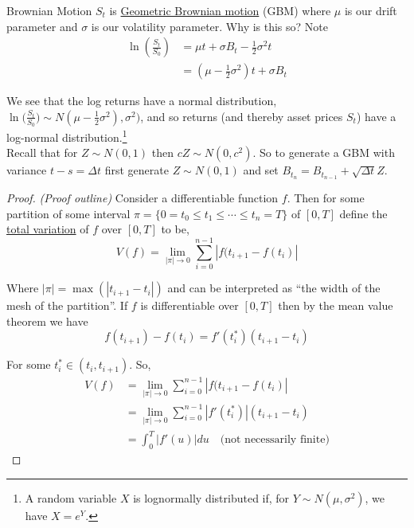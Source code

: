 \documentclass[12pt]{article}
\newenvironment{theorem}[2][Theorem:]{\begin{trivlist} %
\item[\hskip \labelsep {\bfseries #1}\hskip \labelsep {\bfseries #2.}]}{\end{trivlist}}
\newlength\tindent
\renewcommand{\indent}{\hspace*{\tindent}}
\begin{document}
\begin{section}{Brownian Motion}
\indent $S_t$ is \underline{Geometric Brownian motion} (GBM) where $\mu$ is our drift parameter and $\sigma$ is our volatility parameter. Why is this so? Note
\begin{align*}
	\ln \left( \frac{S_t}{S_0} \right) &= \mu t + \sigma B_t - \frac{1}{2}\sigma^2 t \\
	&= \left( \mu - \frac{1}{2}\sigma^2 \right)t + \sigma B_t 
\end{align*}

\indent  We see that the log returns have a normal distribution, $\ln\big(\frac{S_t}{S_0}\big) \sim N(\mu - \frac{1}{2}\sigma^2), \sigma^2)$, and so returns (and thereby asset prices $S_t$) have a log-normal distribution.\footnote{A random variable $X$ is lognormally distributed if, for $Y\sim N(\mu, \sigma^2)$, we have $X=e^Y$.} \\

\indent Recall that for $Z\sim N(0,1)$ then $cZ\sim N(0, c^2)$. So to generate a GBM with variance $t - s = \Delta t$ first generate $Z\sim N(0,1)$ and set $B_{t_n} = B_{t_{n-1}} + \sqrt{\Delta t}Z$.

\begin{theorem}{Brownian motion is continuous everywhere but differentiable nowhere} \hfill
\begin{proof} {\em (Proof outline)} Consider a differentiable function $f$. Then for some partition of some interval $\pi = \{0 = t_0 \leq t_1 \leq \cdots \leq t_n = T\}$ of $[0,T]$ define the \underline{total variation} of $f$ over $[0,T]$ to be,
\begin{equation*}
	V(f) = \lim_{|\pi|\to 0} \sum^{n-1}_{i = 0} |f(t_{i+1} - f(t_i)|
\end{equation*}

\indent Where $|\pi| = \max(|t_{i+1} - t_i|)$ and can be interpreted as ``the width of the mesh of the partition''. If $f$ is differentiable over $[0,T]$ then by the mean value theorem we have
\begin{equation*}
	f(t_{i+1}) - f(t_i) = f'(t^*_i)(t_{i+1} - t_i)
\end{equation*}

For some $t^*_i \in (t_i, t_{i+1})$. So,
\begin{align*}
	V(f) &= \lim_{|\pi|\to 0} \sum^{n-1}_{i = 0} |f(t_{i+1} - f(t_i)| \\
	&= \lim_{|\pi|\to 0} \sum^{n-1}_{i = 0}|f'(t^*_i)|(t_{i+1} - t_i) \\
	&= \int^T_0 \left| f'(u) \right| du \quad \text{(not necessarily finite)}
\end{align*}


\end{proof}
\end{theorem}
\end{section}
\end{document}
